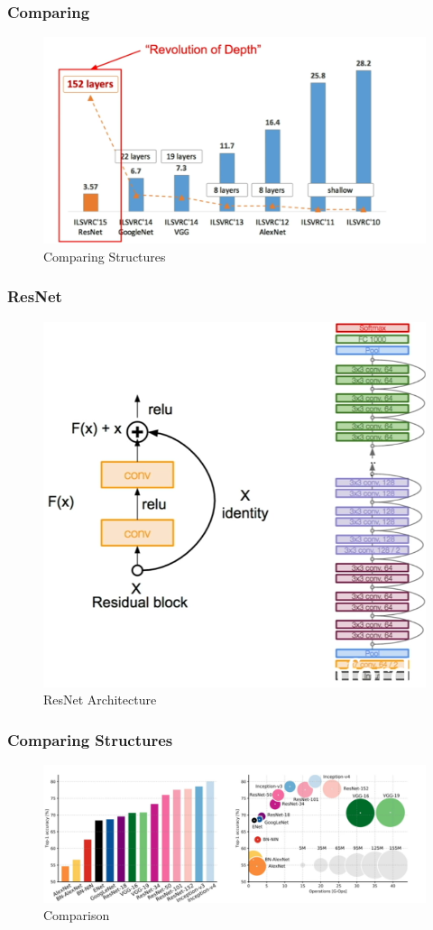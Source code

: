 \documentclass{beamer}
\begin{document}
\begin{frame}
\frametitle{Comparing}

\begin{figure}
	\includegraphics[width=\linewidth]{Pics/com3.png}
	\caption{Comparing Structures}
\end{figure}

\end{frame}
\begin{frame}
\frametitle{ResNet}

\begin{figure}
	\includegraphics[width=.6\linewidth]{Pics/resnet.png}
	\caption{ResNet Architecture}
\end{figure}

\end{frame}
\begin{frame}
	
\frametitle{Comparing  Structures}

\begin{figure}
	\includegraphics[width=\linewidth]{Pics/ccomplex.png}
	\caption{Comparison}
\end{figure}

\end{frame}
	
\end{document}
